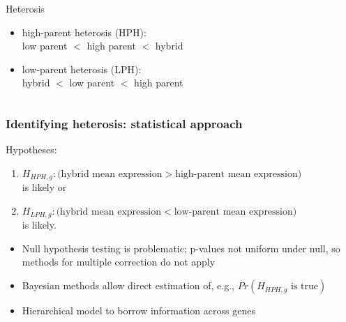 \documentclass[handout]{beamer}
\begin{document}
\begin{frame}
\begin{columns}
\begin{column}{.7\textwidth}
{\begin{beamerboxesrounded}[upper=upcol,lower=lowcol,shadow=true]{Heterosis}
        \begin{itemize}
          \pause \item high-parent heterosis (HPH):\\low parent $<$ high parent $<$ hybrid
          \pause \item low-parent heterosis (LPH):\\ hybrid $<$ low parent $<$ high parent
        \end{itemize}
      \end{beamerboxesrounded}
    }
    \end{column}
  \end{columns}
\end{frame}

\begin{frame}%
  \frametitle{Identifying heterosis: statistical approach}
  Hypotheses:
  {\small
  \begin{enumerate}
    \item $H_{HPH,g}: (\mbox{hybrid mean expression} > \mbox{high-parent mean expression)}$\\ is likely \pause or
    \item $H_{LPH,g}: (\mbox{hybrid mean expression} < \mbox{low-parent mean expression)}$\\ is likely.
  \end{enumerate}
  }

  \begin{itemize}
    \pause \item Null hypothesis testing is problematic; p-values not uniform under null, so methods for multiple correction do not apply
    \pause \item Bayesian methods allow direct estimation of, e.g., $Pr(H_{HPH,g} \mbox{ is true})$
    \pause \item Hierarchical model to borrow information across genes
  \end{itemize}
\end{frame}
\end{document}
